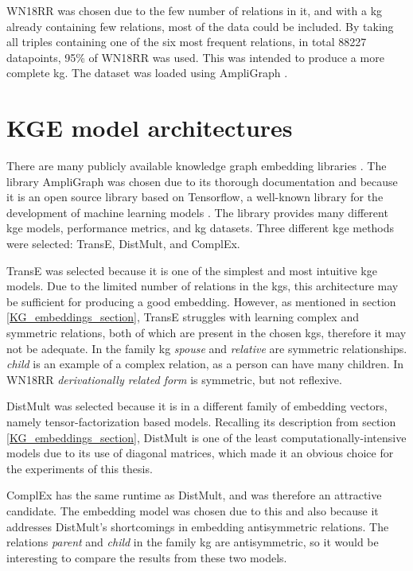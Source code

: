 WN18RR was chosen due to the few number of relations in it, and with a \gls{kg} already containing few relations, most of the data could be included.
By taking all triples containing one of the six most frequent relations, in total 88227 datapoints, 95\% of WN18RR was used. This was intended to produce a more complete \gls{kg}. The dataset was loaded using AmpliGraph \cite{ampligraph}.

\section{KGE model architectures}
\label{selected_KG_embedding_models}
There are many publicly available knowledge graph embedding libraries \cite{libkge, chandrahas-etal-2018-towards, ali2021pykeen}. The library AmpliGraph was chosen due to its thorough documentation and because it is an open source library based on Tensorflow, a well-known library for the development of machine learning models \cite{tensorflow}. The library provides many different \gls{kge} models, performance metrics, and \gls{kg} datasets. Three different \gls{kge} methods were selected: TransE, DistMult, and ComplEx. 

TransE was selected because it is one of the simplest and most intuitive \gls{kge} models. Due to the limited number of relations in the \glspl{kg}, this architecture may be sufficient for producing a good embedding. However, as mentioned in section \ref{KG_embeddings_section}, TransE struggles with learning complex and symmetric relations, both of which are present in the chosen \glspl{kg}, therefore it may not be adequate. In the family \gls{kg} \textit{spouse} and \textit{relative} are symmetric relationships. \textit{child} is an example of a complex relation, as a person can have many children. In WN18RR \textit{derivationally related form} is symmetric, but not reflexive.

DistMult was selected because it is in a different family of embedding vectors, namely tensor-factorization based models. Recalling its description from section \ref{KG_embeddings_section}, DistMult is one of the least computationally-intensive models due to its use of diagonal matrices, which made it an obvious choice for the experiments of this thesis.

ComplEx has the same runtime as DistMult, and was therefore an attractive candidate. The embedding model was chosen due to this and also because it addresses DistMult's shortcomings in embedding antisymmetric relations. The relations \textit{parent} and \textit{child} in the family \gls{kg} are antisymmetric, so it would be interesting to compare the results from these two models.

